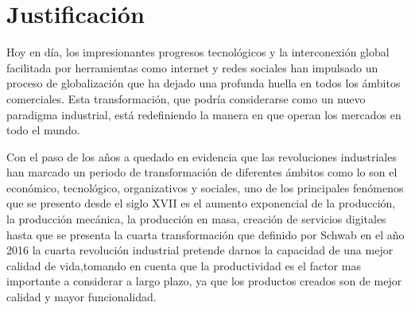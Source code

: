          
        
         
    
    \section{Justificación}
    
    Hoy en día, los impresionantes progresos tecnológicos y la interconexión global facilitada por herramientas como internet y redes sociales han impulsado un proceso de globalización que ha dejado una profunda huella en todos los ámbitos comerciales. Esta transformación, que podría considerarse como un nuevo paradigma industrial, está redefiniendo la manera en que operan los mercados en todo el mundo.
    
    Con el paso de los años a quedado en evidencia que las revoluciones industriales han marcado un periodo de transformación de diferentes ámbitos como lo son el económico, tecnológico, organizativos y sociales, uno de los principales fenómenos que se presento desde el siglo XVII es el aumento exponencial de la producción, la producción mecánica, la producción en masa, creación de servicios digitales hasta que se presenta la cuarta transformación que definido por Schwab en el año 2016 la cuarta revolución industrial pretende darnos la capacidad de una mejor calidad de vida,tomando en cuenta que la productividad es el factor mas importante a considerar a largo plazo, ya que los productos creados son de mejor calidad y mayor funcionalidad.\cite{Schwab}
    
